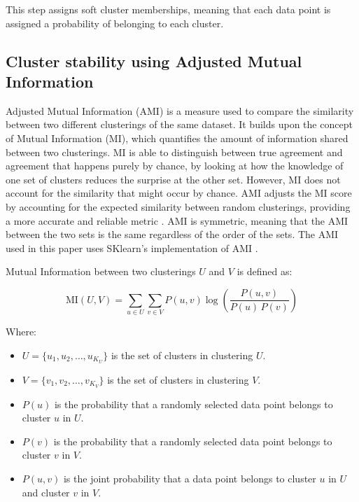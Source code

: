 This step assigns soft cluster memberships, meaning that each data point is assigned a probability of belonging to each cluster.


\subsection*{Cluster stability using  Adjusted Mutual Information}

Adjusted Mutual Information (AMI) is a measure used to compare the similarity between two different clusterings of the same dataset. It builds upon the concept of Mutual Information (MI), which quantifies the amount of information shared between two clusterings. MI is able to distinguish between true agreement and agreement that happens purely by chance, by looking at how the knowledge of one set of clusters reduces the surprise at the other set.
However, MI does not account for the similarity that might occur by chance. AMI adjusts the MI score by accounting for the expected similarity between random clusterings, providing a more accurate and reliable metric \cite{JMLR:v11:vinh10a}. 
AMI is symmetric, meaning that the AMI between the two sets is the same regardless of the order of the sets. The AMI used in this paper uses SKlearn's implementation of AMI \cite{Adjusted_mutual_info_score}.

Mutual Information between two clusterings \( U \) and \( V \) is defined as:

\[
\text{MI}(U, V) = \sum_{u \in U} \sum_{v \in V} P(u, v) \log \left( \frac{P(u, v)}{P(u) \, P(v)} \right)
\]

Where:
\begin{itemize}
    \item \( U = \{u_1, u_2, \dots, u_{K_U}\} \) is the set of clusters in clustering \( U \).
    \item \( V = \{v_1, v_2, \dots, v_{K_V}\} \) is the set of clusters in clustering \( V \).
    \item \( P(u) \) is the probability that a randomly selected data point belongs to cluster \( u \) in \( U \).
    \item \( P(v) \) is the probability that a randomly selected data point belongs to cluster \( v \) in \( V \).
    \item \( P(u, v) \) is the joint probability that a data point belongs to cluster \( u \) in \( U \) and cluster \( v \) in \( V \).
\end{itemize}



